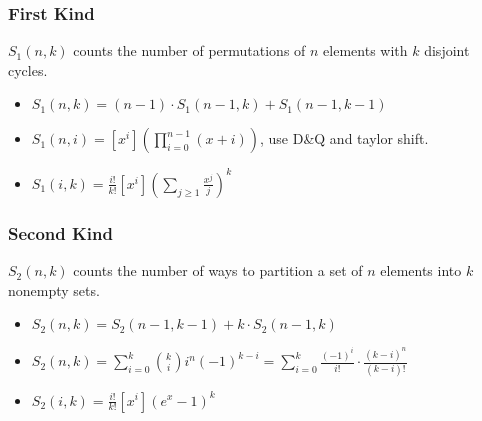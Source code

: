 \subsubsection{First Kind}

$S_1(n, k)$ counts the number of permutations of $n$ elements with $k$ disjoint cycles.

\begin{itemize}[nosep]
  \item
    $S_1(n, k) = (n - 1) \cdot S_1(n - 1, k) + S_1(n - 1, k - 1)$
  \item
    $S_1(n, i) = [x^i] \left(\prod _ {i=0} ^ {n-1} (x + i)\right)$,
    use D\&Q and taylor shift.
  \item
    \(
    S_1(i, k) = \frac{i!}{k!} \left[x^i\right] 
    \left(\sum _ {j \ge 1} \frac{x^j}{j}\right)^k
    \)
\end{itemize}

\subsubsection{Second Kind}

$S_2(n, k)$ counts the number of ways to partition a set of $n$ elements into $k$ nonempty sets.

\begin{itemize}[nosep]
  \item $S_2(n, k) = S_2(n - 1, k - 1) + k \cdot S_2(n - 1, k)$
  \item
    \(
    S_2(n, k) = \sum_{i = 0}^k \binom{k}{i}i^n (-1)^{k - i} = \sum_{i = 0}^k \frac{(-1)^i}{i!} \cdot \frac{(k - i)^n}{(k - i)!}
    \)
  \item
    \(
    S_2(i, k) = \frac{i!}{k!} [x^i] \left(e^x - 1\right)^k
    \)
\end{itemize}
